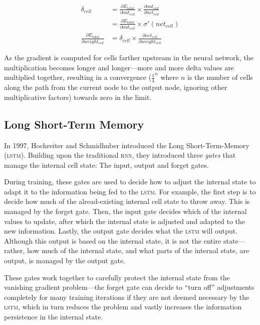 \begin{multicols}{2}
\begin{Figure}
  \begin{align*}
    \delta_{cell} & =
      \frac{\partial E_{total}}{\partial \mathit{out_{cell}}} \times
      \frac{\partial \mathit{out_{cell}}}{\partial \mathit{net_{cell}}} \\
                 & =
      \frac{\partial E_{total}}{\partial \mathit{out_{cell}}} \times
      \sigma'({net}_{cell}) \\
    \frac{\partial E_{total}}{\partial \mathit{weight_{cell}}} & =
      \delta_{cell} \times
      \frac{\partial \mathit{net_{cell}}}{\partial \mathit{weight_{cell}}}
  \end{align*}
\end{Figure}

\noindent As the gradient is computed for cells farther upstream in the neural
network, the multiplication becomes longer and longer---more and more delta
values are multiplied together, resulting in a convergence ($\frac{1}{4}^n$
where $n$ is the number of cells along the path from the current node to the
output node, ignoring other multiplicative factors) towards zero in the limit.

\subsection{Long Short-Term Memory}

In 1997, Hochreiter and Schmidhuber introduced the Long Short-Term-Memory
(\textsc{lstm}).  Building upon the traditional \textsc{rnn}, they introduced
three \textit{gates} that manage the internal cell state: The input, output and
forget gates.

During training, these gates are used to decide how to adjust the internal state
to adapt it to the information being fed to the \textsc{lstm}.  For example, the
first step is to decide how much of the alread-existing internal cell state to
throw away.  This is managed by the forget gate.  Then, the input gate decides
which of the internal values to update, after which the internal state is
adjusted and adapted to the new information.  Lastly, the output gate decides
what the \textsc{lstm} will output.  Although this output is based on the
internal state, it is not the entire state---rather, how much of the internal
state, and what parts of the internal state, are output, is managed by the
output gate.

These gates work together to carefully protect the internal state from the
vanishing gradient problem---the forget gate can decide to ``turn off''
adjustments completely for many training iterations if they are not deemed
necessary by the \textsc{lstm}, which in turn reduces the problem and vastly
increases the information persistence in the internal state.


\end{multicols}
